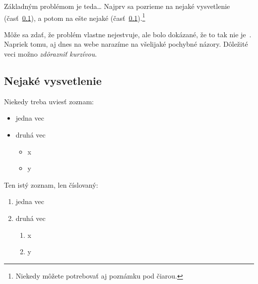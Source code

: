 \documentclass[10pt,onecolumn,twoside,slovak,a4paper]{article}
\begin{document}


Základným problémom je teda\ldots{} Najprv sa pozrieme na nejaké vysvetlenie (časť~\ref{ina:nejake}), a potom na ešte nejaké (časť~\ref{ina:nejake}).\footnote{Niekedy môžete potrebovať aj poznámku pod čiarou.}

Môže sa zdať, že problém vlastne nejestvuje\cite{Coplien:MPD}, ale bolo dokázané, že to tak nie je~\cite{Czarnecki:Staged, Czarnecki:Progress}. Napriek tomu, aj dnes na webe narazíme na všelijaké pochybné názory\cite{PLP-Framework}. Dôležité veci možno \emph{zdôrazniť kurzívou}.


\subsection{Nejaké vysvetlenie} \label{ina:nejake}

Niekedy treba uviesť zoznam:

\begin{itemize}
	\item jedna vec
	\item druhá vec
	      \begin{itemize}
		      \item x
		      \item y
	      \end{itemize}
\end{itemize}

Ten istý zoznam, len číslovaný:

\begin{enumerate}
	\item jedna vec
	\item druhá vec
	      \begin{enumerate}
		      \item x
		      \item y
	      \end{enumerate}
\end{enumerate}
\end{document}
